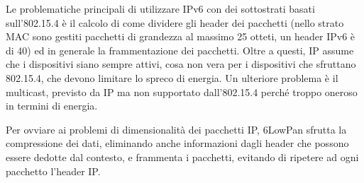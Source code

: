 Le problematiche principali di utilizzare IPv6 con dei sottostrati basati 
sull'802.15.4 è il calcolo di come dividere gli header dei pacchetti (nello 
strato MAC sono gestiti pacchetti di grandezza al massimo 25 otteti, un header 
IPv6 è di 40) ed in generale la frammentazione dei pacchetti. Oltre a questi, IP 
assume che i dispositivi siano sempre attivi, cosa non vera per i dispositivi 
che sfruttano 802.15.4, che devono limitare lo spreco di energia. Un ulteriore 
problema è il multicast, previsto da IP ma non supportato dall'802.15.4 perché 
troppo oneroso in termini di energia.

Per ovviare ai problemi di dimensionalità dei pacchetti IP, 6LowPan sfrutta la 
compressione dei dati, eliminando anche informazioni dagli header che possono 
essere dedotte dal contesto, e frammenta i pacchetti, evitando di ripetere ad 
ogni pacchetto l'header IP.